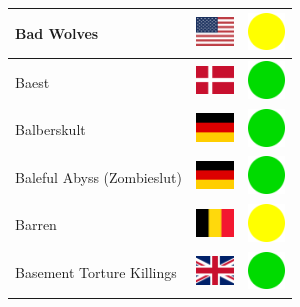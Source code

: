 \documentclass[12pt, a4paper, twoside]{report}
\begin{document}
\begin{center}
\begin{longtable}{|p{5cm}|p{2cm}|p{2cm}|}
 Bad Wolves                                                 & \includegraphics[width=1cm]{../img/flags/us} &   \includegraphics[width=1cm]{../likes/m} \\ \hline
 Baest                                                      & \includegraphics[width=1cm]{../img/flags/dk} &   \includegraphics[width=1cm]{../likes/y} \\ \hline
 Balberskult                                                & \includegraphics[width=1cm]{../img/flags/de} &   \includegraphics[width=1cm]{../likes/y} \\ \hline
 Baleful Abyss (Zombieslut)                                 & \includegraphics[width=1cm]{../img/flags/de} &   \includegraphics[width=1cm]{../likes/y} \\ \hline
 Barren                                                     & \includegraphics[width=1cm]{../img/flags/be} &   \includegraphics[width=1cm]{../likes/m} \\ \hline
 Basement Torture Killings                                  & \includegraphics[width=1cm]{../img/flags/gb} &   \includegraphics[width=1cm]{../likes/y} \\ \hline

\end{longtable}
\end{center}
\end{document}
